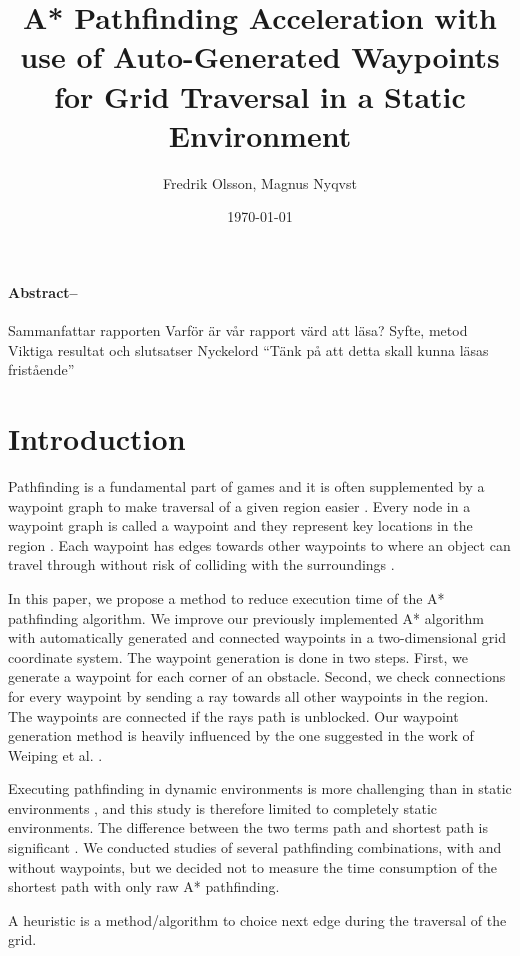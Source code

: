 \documentclass[a4paper]{article}
\title{\Huge A* Pathfinding Acceleration with use of Auto-Generated Waypoints for Grid Traversal in a Static Environment}
\author{Fredrik Olsson, Magnus Nyqvst}
\date{\today}
\begin{document}
\maketitle
\newpage
\thispagestyle{empty}
\paragraph{Abstract--}
Sammanfattar rapporten
Varför är vår rapport värd att läsa?
Syfte, metod
Viktiga resultat och slutsatser Nyckelord
“Tänk på att detta skall kunna läsas fristående”

\tableofcontents
\listoffigures
\newpage
{}
\twocolumn
\section{Introduction}
Pathfinding is a fundamental part of games \cite{dynaPF15}\cite{roboGame15} and it is often supplemented by a waypoint graph to make traversal of a given region easier \cite{dynaPF15}. Every node in a waypoint graph is called a waypoint and they represent key locations in the region \cite{dynaPF15}. Each waypoint has edges towards other waypoints to where an object can travel through without risk of colliding with the surroundings \cite{dynaPF15}.
	
In this paper, we propose a method to reduce execution time of the A* pathfinding algorithm. We improve our previously implemented A* algorithm with automatically generated and connected waypoints in a two-dimensional grid coordinate system. The waypoint generation is done in two steps. First, we generate a waypoint for each corner of an obstacle. Second, we check connections for every waypoint by sending a ray towards all other waypoints in the region. The waypoints are connected if the rays path is unblocked. Our waypoint generation method is heavily influenced by the one suggested in the work of Weiping et al. \cite{dynaPF15}.
	
Executing pathfinding in dynamic environments is more challenging than in static environments \cite{dynaPF15}, and this study is therefore limited to completely static environments. The difference between the two terms path and shortest path is significant \cite{heuristicGame15}. We conducted studies of several pathfinding combinations, with and without waypoints, but we decided not to measure the time consumption of the shortest path with only raw A* pathfinding.
	
A heuristic is a method/algorithm to choice next edge during the traversal of the grid.
\end{document}
